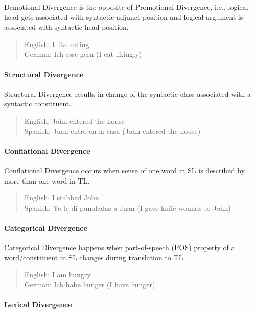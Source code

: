 Demotional Divergence is the opposite of Promotional Divergence, i.e., logical head gets associated with syntactic adjunct position and logical argument is associated with syntactic head position.

\begin{quote}
English: I like eating \\
German: Ich esse gern (I eat likingly)
\end{quote}

\paragraph{Structural Divergence}

Structural Divergence results in change of the syntactic class associated with a syntactic constituent.

\begin{quote}
English: John entered the house \\
Spanish: Juan entro en la casa (John entered the house)
\end{quote}

\paragraph{Conflational Divergence}

Conflational Divergence occurs when sense of one word in SL is described by more than one word in TL.

\begin{quote}
English: I stabbed John \\
Spanish: Yo le di punaladas a Juan (I gave knife-wounds to John)
\end{quote}

\paragraph{Categorical Divergence}

Categorical Divergence happens when part-of-speech (POS) property of a word/constituent in SL changes during translation to TL.

\begin{quote}
English: I am hungry \\
German: Ich habe hunger (I have hunger)
\end{quote}

\paragraph{Lexical Divergence}

